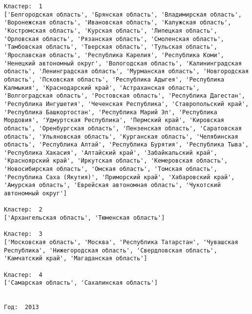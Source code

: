 \documentclass[11pt]{article}
\begin{document}
\begin{Verbatim}[commandchars=\\\{\}]
Кластер:  1
['Белгородская область', 'Брянская область', 'Владимирская область', 'Воронежская область', 'Ивановская область', 'Калужская область', 'Костромская область', 'Курская область', 'Липецкая область', 'Орловская область', 'Рязанская область', 'Смоленская область', 'Тамбовская область', 'Тверская область', 'Тульская область', 'Ярославская область', 'Республика Карелия', 'Республика Коми', 'Ненецкий автономный округ', 'Вологодская область', 'Калинингpадская область', 'Ленинградская область', 'Мурманская область', 'Новгородская область', 'Псковская область', 'Республика Адыгея', 'Республика Калмыкия', 'Краснодарский край', 'Астраханская область', 'Волгоградская область', 'Ростовская область', 'Республика Дагестан', 'Республика Ингушетия', 'Чеченская Республика', 'Ставропольский край', 'Республика Башкортостан', 'Республика Марий Эл', 'Республика Мордовия', 'Удмуртская Республика', 'Пермский край', 'Кировская область', 'Оренбургская область', 'Пензенская область', 'Саратовская область', 'Ульяновская область', 'Курганская область', 'Челябинская область', 'Республика Алтай', 'Республика Бурятия', 'Республика Тыва', 'Республика Хакасия', 'Алтайский край', 'Забайкальский край', 'Красноярский край', 'Иркутская область', 'Кемеровская область', 'Новосибирская область', 'Омская область', 'Томская область', 'Республика Саха (Якутия)', 'Приморский край', 'Хабаровский край', 'Амурская область', 'Еврейская автономная область', 'Чукотский автономный округ']

Кластер:  2
['Архангельская область', 'Тюменская область']

Кластер:  3
['Московская область', 'Москва', 'Республика Татарстан', 'Чувашская Республика', 'Нижегородская область', 'Свердловская область', 'Камчатский край', 'Магаданская область']

Кластер:  4
['Самарская область', 'Сахалинская область']


Год:  2013


\end{Verbatim}
\end{document}
